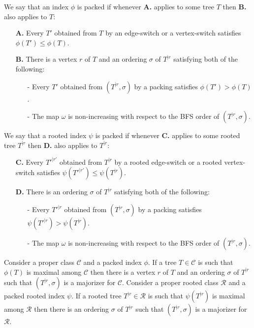 \documentclass[11 pt]{modarticle}
\newcommand{\wmap}{\omega}
\newcommand{\rtree}[2]{{#1}^{\lvert #2}}
\newcommand{\ortree}[3]{(\rtree{#1}{#2},{#3})}
\newcommand{\tclass}{\mathcal{C}}
\newcommand{\rtclass}{\mathcal{R}}
\begin{document}
\begin{defi}\label{def:packed}
We say that an index $\phi$ is packed if whenever \textbf{A.} applies to some tree $T$ then \textbf{B.} also applies to $T$:
\begin{itemize}
	\item[\textbf{A.}] Every $T'$ obtained from $T$ by an edge-switch or a vertex-switch satisfies $\phi(T') \leq \phi(T)$.
	\item[\textbf{B.}] There is a vertex $r$ of $T$ and an ordering $\sigma$ of $\rtree{T}{r}$ satisfying both of the following:
	\begin{itemize}
		\item[-] Every $T'$ obtained from $\ortree{T}{r}{\sigma}$ by a packing satisfies $\phi(T') > \phi(T)$.
		\item[-] The map $\wmap$ is non-increasing with respect to the BFS order of $\ortree{T}{r}{\sigma}$.
	\end{itemize}
\end{itemize}
\end{defi}

\begin{defi}
We say that a rooted index $\psi$ is packed if whenever \textbf{C.} applies to some rooted tree $\rtree{T}{r}$ then \textbf{D.} also applies to $\rtree{T}{r}$:
\begin{itemize}
	\item[\textbf{C.}] Every $\rtree{T'}{r'}$ obtained from $\rtree{T}{r}$ by a rooted edge-switch or a rooted vertex-switch satisfies $\psi(\rtree{T'}{r'}) \leq \psi(\rtree{T}{r})$.
	\item[\textbf{D.}] There is an ordering $\sigma$ of $\rtree{T}{r}$ satisfying both of the following:
	\begin{itemize}
		\item[-] Every $\rtree{T'}{r}$ obtained from $\ortree{T}{r}{\sigma}$ by a packing satisfies $\psi(\rtree{T'}{r}) > \psi(\rtree{T}{r})$.
		\item[-] The map $\wmap$ is non-increasing with respect to the BFS order of $\ortree{T}{r}{\sigma}$.
	\end{itemize}
\end{itemize}
\end{defi}

\begin{thm}\label{thm:maximal-is-majorizer}
Consider a proper class $\tclass$ and a packed index $\phi$. If a tree $T \in \tclass$ is such that $\phi(T)$ is maximal among $\tclass$ then there is a vertex $r$ of $T$ and an ordering $\sigma$ of $\rtree{T}{r}$ such that $\ortree{T}{r}{\sigma}$ is a majorizer for $\tclass$. Consider a proper rooted class $\rtclass$ and a packed rooted index $\psi$. If a rooted tree $\rtree{T}{r} \in \rtclass$ is such that $\psi(\rtree{T}{r})$ is maximal among $\rtclass$ then there is an ordering $\sigma$ of $\rtree{T}{r}$ such that $\ortree{T}{r}{\sigma}$ is a majorizer for $\rtclass$. 
\end{thm}
\end{document}
